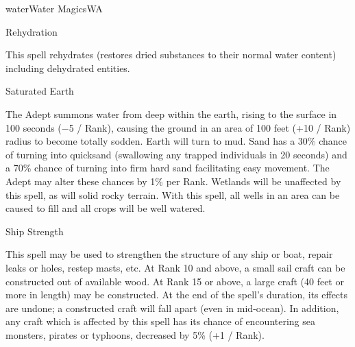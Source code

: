 \begin{College}[1.3]{water}{Water Magics}{WA}
\begin{spell}[G-6]{Rehydration}
\begin{effects}
This spell rehydrates (restores dried substances to their normal
water content) including dehydrated entities.
\end{effects}
\end{spell}

\begin{spell}[G-7]{Saturated Earth}

\begin{effects}
The Adept summons water from deep within the earth, rising to the
surface in 100 seconds (−5 / Rank), causing the ground in an area of
100 feet (+10 / Rank) radius to become totally sodden.  Earth will
turn to mud.  Sand has a 30\% chance of turning into quicksand
(swallowing any trapped individuals in 20 seconds) and a 70\% chance
of turning into firm hard sand facilitating easy movement.  The Adept
may alter these chances by 1\% per Rank.  Wetlands will be unaffected
by this spell, as will solid rocky terrain.  With this spell, all
wells in an area can be caused to fill and all crops will be well
watered.
\end{effects}
\end{spell}

\begin{spell}[G-8]{Ship Strength}

\begin{effects}
This spell may be used to strengthen the structure of any ship or
boat, repair leaks or holes, restep masts, etc.  At Rank 10 and above,
a small sail craft can be constructed out of available wood.  At Rank
15 or above, a large craft (40 feet or more in length) may be
constructed.  At the end of the spell’s duration, its effects are
undone; a constructed craft will fall apart (even in mid-ocean). In
addition, any craft which is affected by this spell has its chance of
encountering sea monsters, pirates or typhoons, decreased by 5\% (+1 /
Rank).
\end{effects}
\end{spell}


\end{College}
